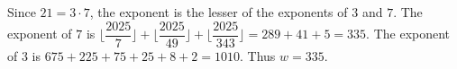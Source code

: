 Since $21=3\cdot7$, the exponent is the lesser of the exponents of $3$ and $7$. The exponent of $7$ is $\lfloor\dfrac{2025}{7}\rfloor+\lfloor\dfrac{2025}{49}\rfloor+\lfloor\dfrac{2025}{343}\rfloor=289+41+5=335$. The exponent of $3$ is $675+225+75+25+8+2=1010$. Thus $\boxed{w=335}$.
